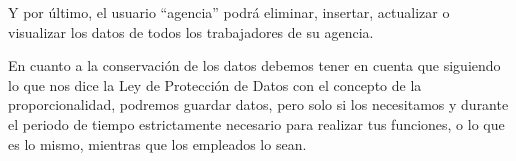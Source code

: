 	\newp Y por último, el usuario “agencia” podrá eliminar, insertar, actualizar o visualizar los datos de todos los trabajadores de su agencia.
	
	
	\newp En cuanto a la conservación de los datos debemos tener en cuenta que siguiendo lo que nos dice la Ley de Protección de Datos con el concepto de la proporcionalidad, podremos guardar datos, pero solo si los necesitamos y durante el periodo de tiempo estrictamente necesario para realizar tus funciones, o lo que es lo mismo, mientras que los empleados lo sean.
	
	
	